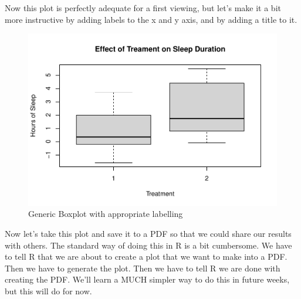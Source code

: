 \documentclass[
]{book}
\newenvironment{Shaded}{\begin{snugshade}}{\end{snugshade}}
\newcommand{\AttributeTok}[1]{\textcolor[rgb]{0.13,0.29,0.53}{#1}}
\newcommand{\CommentTok}[1]{\textcolor[rgb]{0.56,0.35,0.01}{\textit{#1}}}
\newcommand{\FunctionTok}[1]{\textcolor[rgb]{0.13,0.29,0.53}{\textbf{#1}}}
\newcommand{\NormalTok}[1]{#1}
\newcommand{\SpecialCharTok}[1]{\textcolor[rgb]{0.81,0.36,0.00}{\textbf{#1}}}
\newcommand{\StringTok}[1]{\textcolor[rgb]{0.31,0.60,0.02}{#1}}
\begin{document}
Now this plot is perfectly adequate for a first viewing, but let's make it a bit more instructive by adding labels to the x and y axis, and by adding a title to it.

\begin{Shaded}
\end{Shaded}

\begin{figure}
\centering
\includegraphics{gitbook-demo_files/figure-latex/unnamed-chunk-9-1.pdf}
\caption{\label{fig:unnamed-chunk-9}Generic Boxplot with appropriate labelling}
\end{figure}

Now let's take this plot and save it to a PDF so that we could share our results with others. The standard way of doing this in R is a bit cumbersome. We have to tell R that we are about to create a plot that we want to make into a PDF. Then we have to generate the plot. Then we have to tell R we are done with creating the PDF. We'll learn a MUCH simpler way to do this in future weeks, but this will do for now.
\end{document}
